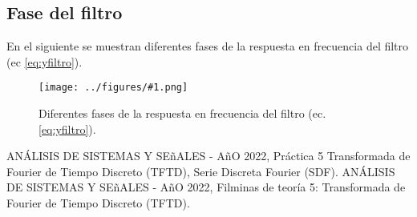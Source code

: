 \documentclass[letterpaper, 10 pt, conference]{ieeeconf}  %
\newcommand{\image}[2] {
  \begin{figure}[H]
    \centering
    \texttt{[image: ../figures/\#1.png]}
    \caption{#2}
    \label{fig:#1}
  \end{figure}
}
\begin{document}
\subsection{Fase del filtro}
En el siguiente se muestran diferentes fases de la respuesta en frecuencia del filtro (ec \ref{eq:yfiltro}).
\image{HPhiA}{Diferentes fases de la respuesta en frecuencia del filtro (ec. \ref{eq:yfiltro}).}

\begin{thebibliography}{99}

ANÁLISIS DE SISTEMAS Y SE\~{n}ALES - A\~{n}O 2022, Práctica 5 Transformada de Fourier de Tiempo Discreto (TFTD), Serie Discreta Fourier (SDF).
ANÁLISIS DE SISTEMAS Y SE\~{n}ALES - A\~{n}O 2022, Filminas de teor\'ia 5: Transformada de Fourier de Tiempo Discreto (TFTD).

\end{thebibliography}
\end{document}
